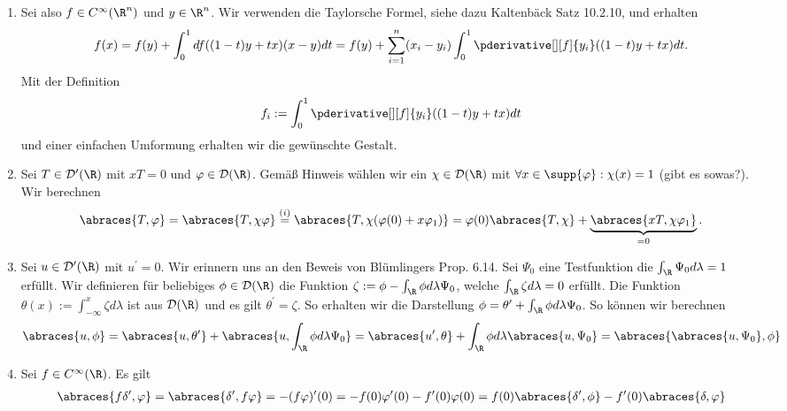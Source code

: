 \begin{solution}
\phantom{}
\begin{enumerate}[label = (\roman*)]
	\item Sei also $f \in C^\infty(\R^n)$ und $y \in \R^n$. Wir verwenden die Taylorsche Formel, siehe dazu Kaltenbäck Satz 10.2.10, und erhalten
	\begin{align*}
	f(x) = f(y) + \int_0^1 df((1-t)y + tx)(x - y) dt = f(y) + \sum_{i = 1}^n (x_i - y_i) \int_0^1 \pderivative[][f]{y_i} ((1-t)y + tx) dt.
	\end{align*}
	Mit der Definition
	\begin{align*}
	f_i := \int_0^1  \pderivative[][f]{y_i} ((1-t)y + tx) dt
	\end{align*}
	und einer einfachen Umformung erhalten wir die gewünschte Gestalt.
	\item Sei $T \in \mathcal{D}^\prime(\R)$ mit $xT = 0$ und $\varphi \in \mathcal{D}(\R)$. Gemäß Hinweis wählen wir ein $\chi \in \mathcal{D}(\R)$ mit $\forall x \in \supp{\varphi}: \chi(x) = 1$ (gibt es sowas?). Wir berechnen
	\begin{align*}
	\abraces{T,\varphi} = \abraces{T, \chi \varphi} \stackrel{(i)}{=} \abraces{T, \chi (\varphi(0) + x\varphi_1)} = \varphi(0) \abraces{T, \chi} + \underbrace{\abraces{xT, \chi \varphi_1}}_{=0}.
	\end{align*}
	\item Sei $u \in \mathcal{D}^\prime(\R)$ mit $u^\prime = 0$. Wir erinnern uns an den Beweis von Blümlingers Prop. 6.14. Sei $\Psi_0$ eine Testfunktion die $\int_\R \Psi_0 d\lambda = 1$ erfüllt. Wir definieren für beliebiges $\phi \in \mathcal{D}(\R)$ die Funktion $\zeta := \phi - \int_\R \phi d\lambda \Psi_0$, welche $\int_\R \zeta d\lambda = 0$ erfüllt. Die Funktion $\theta(x) := \int_{-\infty}^{x} \zeta d\lambda$ ist aus $\mathcal{D}(\R)$ und es gilt $\theta^\prime = \zeta$. So erhalten wir die Darstellung $\phi = \theta^\prime + \int_\R \phi d\lambda \Psi_0$. So können wir berechnen
	\begin{align*}
	\abraces{u, \phi} = \abraces{u, \theta^\prime} + \abraces{u, \int_\R \phi d\lambda \Psi_0} = \abraces{u^\prime, \theta} + \int_\R \phi d\lambda \abraces{u, \Psi_0} = \abraces{\abraces{u, \Psi_0}, \phi}
	\end{align*}
	\item Sei $f \in C^\infty(\R)$. Es gilt
	\begin{align*}
	\abraces{f \delta^\prime, \varphi} = \abraces{\delta^\prime, f\varphi} = - (f\varphi)^\prime (0) = -f(0) \varphi^\prime(0) - f^\prime(0) \varphi(0) = f(0) \abraces{\delta^\prime, \phi} - f^\prime(0) \abraces{\delta, \varphi}
	\end{align*}
\end{enumerate}

\end{solution}

